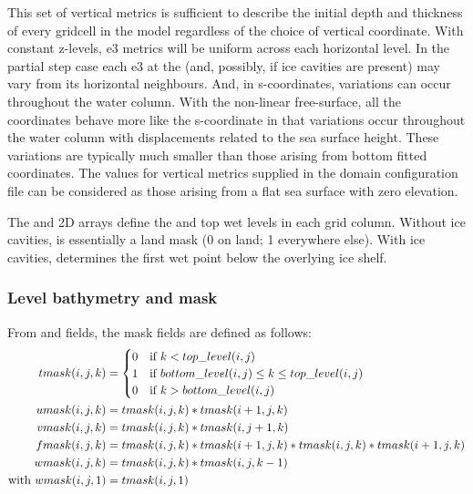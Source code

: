 \documentclass[../main/NEMO_manual]{subfiles}
\begin{document}
This set of vertical metrics is sufficient to describe the initial depth and thickness of
every gridcell in the model regardless of the choice of vertical coordinate.
With constant z-levels, e3 metrics will be uniform across each horizontal level.
In the partial step case each e3 at the 
(and, possibly,  if ice cavities are present)
may vary from its horizontal neighbours.
And, in s-coordinates, variations can occur throughout the water column.
With the non-linear free-surface, all the coordinates behave more like the s-coordinate in that
variations occur throughout the water column with displacements related to the sea surface height.
These variations are typically much smaller than those arising from bottom fitted coordinates.
The values for vertical metrics supplied in the domain configuration file can be considered as
those arising from a flat sea surface with zero elevation.

The  and  2D arrays define
the  and top wet levels in each grid column.
Without ice cavities,  is essentially a land mask (0 on land; 1 everywhere else).
With ice cavities,  determines the first wet point below the overlying ice shelf.

\subsubsection{Level bathymetry and mask}
\label{subsec:DOM_msk}

From  and  fields, the mask fields are defined as follows:
\begin{align*}
  tmask(i,j,k) &=
  \begin{cases}
    0 &\text{if $                             k <    top\_level(i,j)$} \\
    1 &\text{if $     bottom\_level(i,j) \leq k \leq top\_level(i,j)$} \\
    0 &\text{if $k >  bottom\_level(i,j)                            $}
  \end{cases} \\
  umask(i,j,k) &= tmask(i,j,k) * tmask(i + 1,j,    k) \\
  vmask(i,j,k) &= tmask(i,j,k) * tmask(i    ,j + 1,k) \\
  fmask(i,j,k) &= tmask(i,j,k) * tmask(i + 1,j,    k) * tmask(i,j,k) * tmask(i + 1,j,    k) \\
  wmask(i,j,k) &= tmask(i,j,k) * tmask(i    ,j,k - 1) \\
  \text{with~} wmask(i,j,1) &= tmask(i,j,1)
\end{align*}
\end{document}

